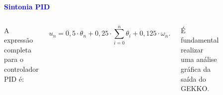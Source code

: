 \documentclass[aspectratio=169]{beamer}
\begin{document}
\begin{frame}{\textcolor{blue}{\textbf{Sintonia PID}}}
\begin{columns}
\vspace{-1.15cm}

\justifying A expressão completa para o controlador PID é:

\begin{equation}
     u_n = 0,5 \cdot \theta_n + 0,25\cdot \sum_{i=0}^n \theta_i + 0,125 \cdot \omega_n.
    \label{eq:39}
\end{equation}

\justifying É fundamental realizar uma análise gráfica da saída do GEKKO.

\vspace{-0.7625cm}

\begin{figure}[H]
\vspace{.2cm}
     \centering
     \includegraphics[scale=.5]{images/pid.png}
     \label{fcte}
\end{figure}

\end{columns}
\end{frame}

\end{document}

